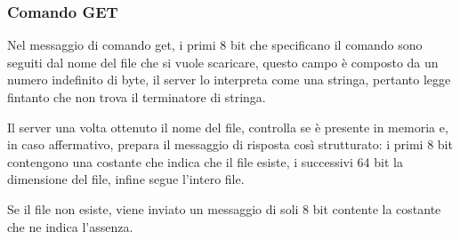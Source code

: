 \subsubsection{Comando GET}
Nel messaggio di comando get, i primi 8 bit che specificano il comando sono seguiti dal nome del file che si vuole scaricare, questo campo è composto da un numero indefinito di byte, il server lo interpreta come una stringa, pertanto legge fintanto che non trova il terminatore di stringa.


Il server una volta ottenuto il nome del file, controlla se è presente in memoria e, in caso affermativo, prepara il messaggio di risposta così strutturato:
i primi 8 bit contengono una costante che indica che il file esiste, i successivi 64 bit la dimensione del file, infine segue l'intero file.

	
Se il file non esiste, viene inviato un messaggio di soli 8 bit contente la costante che ne indica l'assenza.

